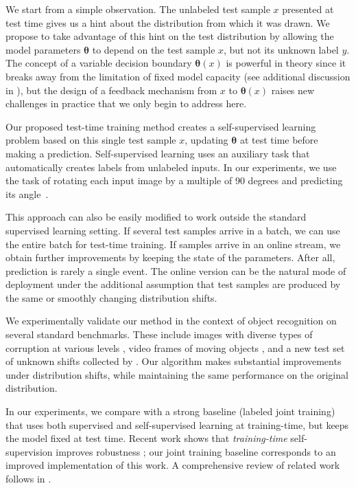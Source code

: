 \documentclass{article}
\theoremstyle{plain}
\theoremstyle{remark}
\theoremstyle{definition}
\def\vtheta{{\bm{\theta}}}
\begin{document}
We start from a simple observation. 
The unlabeled test sample $x$ presented at test time gives us a hint about the distribution from which it was drawn. 
We propose to take advantage of this hint on the test distribution by allowing the model parameters $\vtheta$
to depend on the test sample $x$, but not its unknown label $y$.
The concept of a variable decision boundary $\vtheta(x)$ is powerful in theory since it breaks away from the limitation of fixed model capacity (see additional discussion in ), but the design of a feedback mechanism from $x$ to $\vtheta(x)$ raises new challenges in practice that we only begin to address here.

Our proposed test-time training method creates a self-supervised learning problem based on this single test sample $x$, updating $\vtheta$ at test time before making a prediction. 
Self-supervised learning uses an auxiliary task that automatically creates labels from unlabeled inputs.
In our experiments, we use the task of rotating each input image by a multiple of 90 degrees and predicting its angle~\citep{gidaris2018unsupervised}.

This approach can also be easily modified to work outside the standard supervised learning setting. 
If several test samples arrive in a batch, we can use the entire batch for test-time training.
If samples arrive in an online stream, we obtain further improvements by keeping the state of the parameters.
After all, prediction is rarely a single event. The online version can be the natural mode of deployment under the additional assumption that test samples are produced by the same or smoothly changing distribution shifts.

We experimentally validate our method in the context of object recognition on several standard benchmarks. These include images with diverse types of corruption at various levels \citep{hendrycks2019benchmarking},  video frames of moving objects \citep{shankar2019systematic}, and a new test set of unknown shifts collected by \cite{recht2018cifar}. 
Our algorithm makes substantial improvements under distribution shifts, while maintaining the same performance on the original distribution.

In our experiments, we compare with a strong baseline (labeled joint training) that uses both supervised and self-supervised learning at training-time, but keeps the model fixed at test time.
Recent work shows that \emph{training-time} self-supervision improves robustness \citep{hendrycks2019using}; our joint training baseline corresponds to an improved implementation of this work. 
A comprehensive review of related work follows in .
\end{document}

